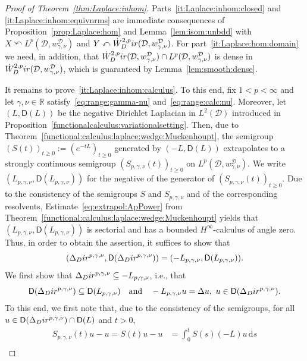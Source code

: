 \documentclass[10pt,a4paper]{amsart}
\newcommand{\Dir}{\textup{Dir}}
\newcommand{\R}{\ensuremath{\mathbb{R}}}
\newcommand{\calD}{\ensuremath{\mathcal{D}}}
\newcommand{\sfD}{\ensuremath{\mathsf{D}}}
\begin{document}
\begin{proof}[Proof of Theorem~\ref{thm:Laplace:inhom}]
Parts~\ref{it:Laplace:inhom:closed} and \ref{it:Laplace:inhom:equivnrms} are immediate consequences of Proposition~\ref{prop:Laplace:hom} and Lemma~\ref{lem:isom:unbdd} with $X\curvearrowleft L^p(\calD,w_{\gamma,\nu}^\calD)$ and $Y\curvearrowleft \Dot W^{2,p}_\Dir(\calD,w_{\gamma,\nu}^\calD)$. 
For part~\ref{it:Laplace:hom:domain} we need, in addition, that $\Dot{W}^{2,p}_\Dir(\calD,w_{\gamma,\nu}^\calD)\cap L^p(\calD,w_{\gamma,\nu}^\calD)$ is dense in $\Dot W^{2,p}_\Dir (\calD,w_{\gamma,\nu}^\calD)$, which is guaranteed by Lemma~\ref{lem:smooth:dense}.

It remains to prove~\ref{it:Laplace:inhom:calculus}.
To this end, fix $1<p<\infty$ and let $\gamma,\nu\in\R$ satisfy~\eqref{eq:range:gamma-nu} and~\eqref{eq:range:calc:nu}.
Moreover, let $(L,\sfD(L))$ be the negative Dirichlet Laplacian in $L^2(\calD)$ introduced in Proposition~\ref{functionalcalculus:variationalsetting}.
Then, due to Theorem~\ref{functional:calculus:laplace:wedge:Muckenhoupt}, the semigroup $(S(t))_{t\geq 0}:=(e^{-tL})_{t\geq 0}$ generated by $(-L,\sfD(L))$ extrapolates to a strongly continuous semigroup $(S_{p,\gamma,\nu}(t))_{t\geq 0}$ on $L^p(\calD,w_{\gamma,\nu}^\calD)$. We write $(L_{p,\gamma,\nu},\sfD(L_{p,\gamma,\nu}))$ for the negative of the generator of $(S_{p,\gamma,\nu}(t))_{t\geq 0}$. Due to the consistency of the semigroups $S$ and $S_{p,\gamma,\nu}$ and of the corresponding resolvents, Estimate~\eqref{eq:extrapol:ApPower} from Theorem~\ref{functional:calculus:laplace:wedge:Muckenhoupt} yields that $(L_{p,\gamma,\nu},\sfD(L_{p,\gamma,\nu}))$ is sectorial and has a bounded $H^\infty$-calculus of angle zero. Thus, in order to obtain the assertion, it suffices to show that
\[
(\Delta_\Dir^{p,\gamma,\nu},\sfD(\Delta_\Dir^{p,\gamma,\nu}))
= 
(-L_{p,\gamma,\nu},\sfD(L_{p,\gamma,\nu})).
\]
We first show that $\Delta_\Dir^{p,\gamma,\nu}\subseteq -L_{p,\gamma,\nu}$, i.e., that
\begin{equation}\label{eq:inclusion1}
\sfD(\Delta_\Dir^{p,\gamma,\nu})\subseteq \sfD(L_{p,\gamma,\nu}) 
\quad\text{and}\quad
-L_{p,\gamma,\nu}u=\Delta u,\,\, u\in \sfD(\Delta_\Dir^{p,\gamma,\nu}).    
\end{equation}
To this end,
we first note that,
due to the consistency of the semigroups, 
for all $u\in \sfD(\Delta_\Dir^{p,\gamma,\nu}) \cap \sfD(L)$ and $t>0$,
\begin{align*}
S_{p,\gamma,\nu}(t)u - u
=
S(t)u - u
&=
\int_0^t S(s)(-L)u\,\mathrm{d}s\\

\end{align*}
\end{proof}
\end{document}
